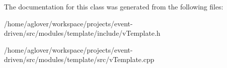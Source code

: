The documentation for this class was generated from the following files\+:\begin{DoxyCompactItemize}
\item 
/home/aglover/workspace/projects/event-\/driven/src/modules/template/include/v\+Template.\+h\item 
/home/aglover/workspace/projects/event-\/driven/src/modules/template/src/v\+Template.\+cpp\end{DoxyCompactItemize}
